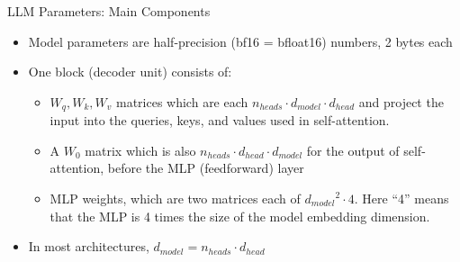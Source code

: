 



\def\myblue#1{\textcolor{texblue}{#1}}

\def\qmark{\myblue{?!?}}

\newcommand{\learninggoals}{
\item Learn to calculate Transformer number of parameters
\item Understand Transformer computation and memory load
\item Learn about Flash Attentions
\item Understand Scaling Laws and Chinchilla
}
\def\myblue#1{\textcolor{texblue}{#1}}

\title{}
\date{}







\begin{vbframe}{LLM Parameters: Main Components}

\vfill


\begin{itemize}
    \item Model parameters are half-precision (bf16 = bfloat16)
    numbers,  2 bytes each
    \item One block (decoder unit) consists of:
		\begin{itemize}
		\item $W_q, W_k, W_v$ matrices which are
    each $n_{heads} \cdot d_{model} \cdot  d_{head}$ and project the input into the queries, keys, and values used in self-attention. 
		\item A $W_0$ matrix which is also
    $n_{heads} \cdot d_{head} \cdot d_{model} $ for the output of self-attention, before the MLP (feedforward) layer
		\item MLP weights, which are two matrices
    each of ${d_{model}}^2 \cdot 4$. Here
    ``4''  means that the MLP is 4 times the size of the model embedding dimension. 
		\end{itemize}
	\item In most architectures, $d_{model} = n_{heads} \cdot d_{head}$
\end{itemize}

\vfill

\end{vbframe}

